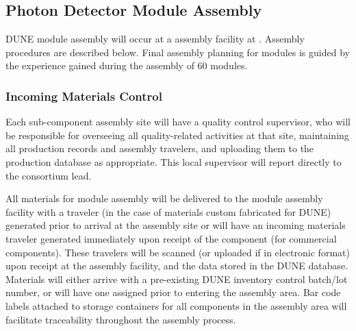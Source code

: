 

\subsection{Photon Detector Module Assembly}

DUNE   module assembly will occur at a  assembly facility at .  Assembly procedures are described below.  Final assembly planning for  modules is guided by the experience gained during the assembly of \num{60}   modules. 


\subsubsection{Incoming Materials Control}


Each  sub-component assembly site will have a quality control supervisor, who will be responsible for overseeing all quality-related activities at that site, maintaining all production records and assembly travelers, and uploading them to the production database as appropriate.   This local supervisor will report directly to the  consortium lead.

All materials for  module assembly will be delivered to the  module assembly facility with a  traveler (in the case of materials custom fabricated for DUNE) generated prior to arrival at the assembly site or will have an incoming materials traveler generated immediately upon receipt of the component (for commercial components).  These travelers will be scanned (or uploaded if in electronic format) upon receipt at the assembly facility, and the data stored in the DUNE  database.  Materials will either arrive with a pre-existing DUNE inventory control batch/lot number, or will have one assigned prior to entering the assembly area.  Bar code labels attached to storage containers for all components in the assembly area will facilitate traceability throughout the assembly process.

